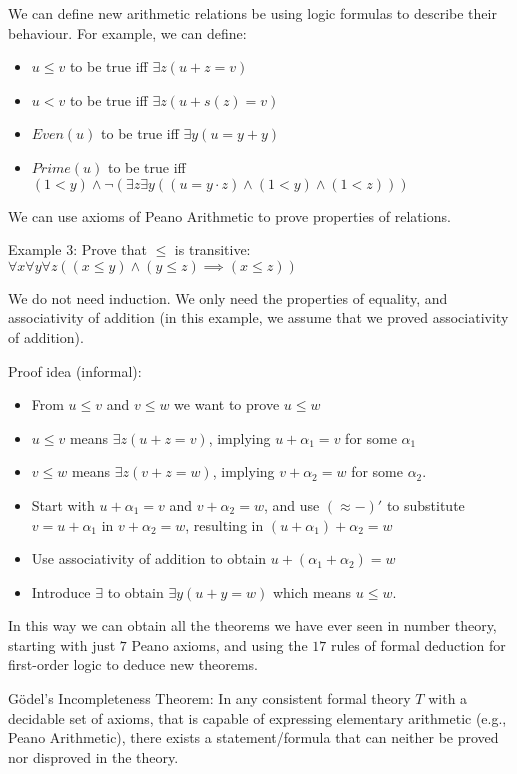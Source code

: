 \documentclass{article}
\begin{document}
We can define new arithmetic relations be using logic formulas to describe their behaviour. For example, we can define:
\begin{itemize}
    \item $u \le v$ to be true iff $\exists z (u + z = v)$
    \item $u < v$ to be true iff $\exists z (u + s(z) = v)$
    \item $Even(u)$ to be true iff $\exists y (u = y + y)$
    \item $Prime(u)$ to be true iff $(1 < y) \wedge \neg (\exists z \exists y ((u = y \cdot z) \wedge ( 1 < y) \wedge ( 1 < z)))$
\end{itemize}

We can use axioms of Peano Arithmetic to prove properties of relations.

Example 3: Prove that $\le$ is transitive: $\forall x \forall y \forall z ((x \le y) \wedge (y \le z) \implies (x \le z))$

We do not need induction. We only need the properties of equality, and associativity of addition (in this example, we assume that we proved associativity of addition).

Proof idea (informal):
\begin{itemize}
    \item From $u \le v$ and $v \le w$ we want to prove $u \le w$
    \item $u \le v$ means $\exists z (u + z = v)$, implying $u + \alpha_1 = v$ for some $\alpha_1$
    \item $v \le w$ means $\exists z (v + z = w)$, implying $v + \alpha_2 = w$ for some $\alpha_2$.
    \item Start with $u + \alpha_1 = v$ and $v + \alpha_2 = w$, and use $(\approx - )'$ to substitute $v = u + \alpha_1$ in $v + \alpha_2 = w$, resulting in $(u + \alpha_1) + \alpha_2 = w$
    \item Use associativity of addition to obtain $u + (\alpha_1 + \alpha_2) = w$
    \item Introduce $\exists$ to obtain $\exists y (u + y = w)$ which means $u \le w$.
\end{itemize}


In this way we can obtain all the theorems we have ever seen in number theory, starting with just $7$ Peano axioms, and using the $17$ rules of formal deduction for first-order logic to deduce new theorems. 

Gödel's Incompleteness Theorem: In any consistent formal theory $T$ with a decidable set of axioms, that is capable of expressing elementary arithmetic (e.g., Peano Arithmetic), there exists a statement/formula that can neither be proved nor disproved in the theory.
\end{document}
